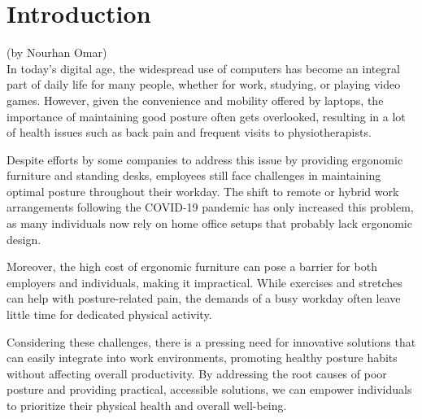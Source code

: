 \documentclass{article}
\begin{document}
\section*{Introduction}

(by Nourhan Omar)\\

In today's digital age, the widespread use of computers has become an integral part of daily life for many people, whether for work, studying, or playing video games. However, given the convenience and mobility offered by laptops, the importance of maintaining good posture often gets overlooked, resulting in a lot of health issues such as back pain and frequent visits to physiotherapists.

Despite efforts by some companies to address this issue by providing ergonomic furniture and standing desks, employees still face challenges in maintaining optimal posture throughout their workday. The shift to remote or hybrid work arrangements following the COVID-19 pandemic has only increased this problem, as many individuals now rely on home office setups that probably lack ergonomic design.

Moreover, the high cost of ergonomic furniture can pose a barrier for both employers and individuals, making it impractical. While exercises and stretches can help with posture-related pain, the demands of a busy workday often leave little time for dedicated physical activity.

Considering these challenges, there is a pressing need for innovative solutions that can easily integrate into work environments, promoting healthy posture habits without affecting overall productivity. By addressing the root causes of poor posture and providing practical, accessible solutions, we can empower individuals to prioritize their physical health and overall well-being.
\end{document}
